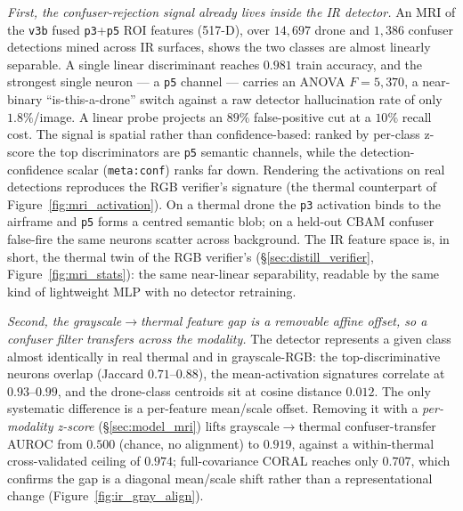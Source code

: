 \emph{First, the confuser-rejection signal already lives inside the IR detector.} An MRI of the \texttt{v3b} fused \texttt{p3}+\texttt{p5} ROI features (517-D), over $14{,}697$ drone and $1{,}386$ confuser detections mined across IR surfaces, shows the two classes are almost linearly separable. A single linear discriminant reaches $0.981$ train accuracy, and the strongest single neuron --- a \texttt{p5} channel --- carries an ANOVA $F=5{,}370$, a near-binary ``is-this-a-drone'' switch against a raw detector hallucination rate of only $1.8\%$/image. A linear probe projects an $89\%$ false-positive cut at a $10\%$ recall cost. The signal is spatial rather than confidence-based: ranked by per-class z-score the top discriminators are \texttt{p5} semantic channels, while the detection-confidence scalar (\texttt{meta:conf}) ranks far down. Rendering the activations on real detections reproduces the RGB verifier's signature (the thermal counterpart of Figure~\ref{fig:mri_activation}). On a thermal drone the \texttt{p3} activation binds to the airframe and \texttt{p5} forms a centred semantic blob; on a held-out CBAM confuser false-fire the same neurons scatter across background. The IR feature space is, in short, the thermal twin of the RGB verifier's (\S\ref{sec:distill_verifier}, Figure~\ref{fig:mri_stats}): the same near-linear separability, readable by the same kind of lightweight MLP with no detector retraining.

\emph{Second, the grayscale$\rightarrow$thermal feature gap is a removable affine offset, so a confuser filter transfers across the modality.} The detector represents a given class almost identically in real thermal and in grayscale-RGB: the top-discriminative neurons overlap (Jaccard $0.71$--$0.88$), the mean-activation signatures correlate at $0.93$--$0.99$, and the drone-class centroids sit at cosine distance $0.012$. The only systematic difference is a per-feature mean/scale offset. Removing it with a \emph{per-modality z-score} (\S\ref{sec:model_mri}) lifts grayscale$\rightarrow$thermal confuser-transfer AUROC from $0.500$ (chance, no alignment) to $0.919$, against a within-thermal cross-validated ceiling of $0.974$; full-covariance CORAL reaches only $0.707$, which confirms the gap is a diagonal mean/scale shift rather than a representational change (Figure~\ref{fig:ir_gray_align}).

